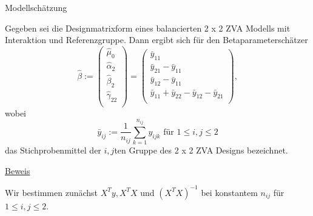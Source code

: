 \documentclass[
  8pt,
  ignorenonframetext,
]{beamer}
\begin{document}
\begin{frame}{Modellschätzung}
\protect\hypertarget{modellschuxe4tzung-7}{}
\footnotesize
\begin{theorem}
\justifying
\normalfont
Gegeben sei die Designmatrixform eines balancierten 2 x 2 ZVA Modells mit
Interaktion und Referenzgruppe. Dann ergibt sich für den Betaparameterschätzer
\begin{equation}
\hat{\beta} :=
\begin{pmatrix}
\hat{\mu}_0       \\
\hat{\alpha}_2    \\
\hat{\beta}_2     \\
\hat{\gamma}_{22} \\
\end{pmatrix}
=
\begin{pmatrix}
\bar{y}_{11} \\
\bar{y}_{21} - \bar{y}_{11} \\
\bar{y}_{12} - \bar{y}_{11} \\
\bar{y}_{11} + \bar{y}_{22} - \bar{y}_{12} - \bar{y}_{21}  \\
\end{pmatrix},
\end{equation}
wobei
\begin{equation}
\bar{y}_{ij} := \frac{1}{n_{ij}}\sum_{k = 1}^{n_{ij}} y_{ijk} \mbox{ für } 1 \le i,j \le 2
\end{equation}
das Stichprobenmittel der $i,j$ten Gruppe des 2 x 2 ZVA Designs bezeichnet.
\end{theorem}

\footnotesize

\underline{Beweis}

Wir bestimmen zunächst \(X^Ty, X^TX\) und \((X^TX)^{-1}\) bei konstantem
\(n_{ij}\) für \(1 \le i,j \le 2\).
\end{frame}
\end{document}
